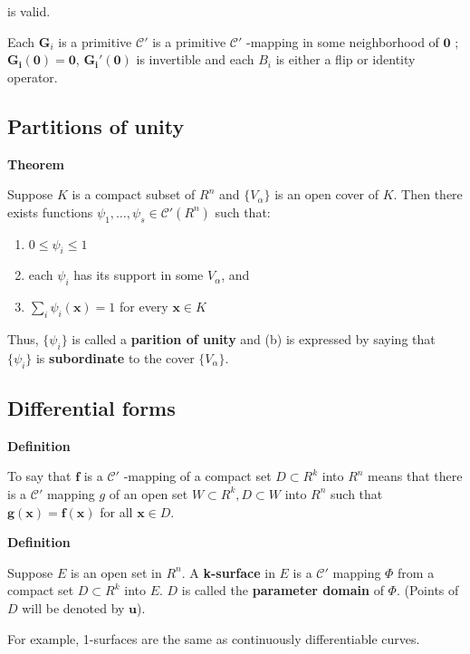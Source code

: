 \documentclass[11pt]{article}
\begin{document}
is valid.

Each \(\bm{G}_i\) is a primitive \(\mathcal{C}'\) is a primitive \(\mathcal{C}'\) -mapping in some neighborhood of \(\bm{0}\) ; \(\bm{G_i(0)=0}\), \(\bm{G_i'(0)}\) is invertible and each \(B_i\) is either a flip or identity operator.


\subsection{Partitions of unity}
\label{sec:org1d97ba3}

\textbf{Theorem}

Suppose \(K\) is a compact subset of \(R^n\) and \(\{V_\alpha\}\) is an open cover of \(K\). Then there exists functions \(\psi_1,\ldots,\psi_s \in \mathcal{C}'(R^n)\) such that:

\begin{enumerate}
\item \(0 \leq \psi_i \leq 1\)
\item each \(\psi_i\) has its support in some \(V_\alpha\), and
\item \(\sum_i \psi_i(\bm{x}) = 1\) for every \(\bm{x} \in K\)
\end{enumerate}

Thus, \(\{\psi_i\}\) is called a \textbf{parition of unity} and (b) is expressed by saying that \(\{\psi_i\}\) is \textbf{subordinate} to the cover \(\{V_\alpha\}\).

\subsection{Differential forms}
\label{sec:orgbcc6b72}

\textbf{Definition}

To say that \(\bm{f}\) is a \(\mathcal{C}'\) -mapping of a compact set \(D \subset R^k\) into \(R^n\) means that there is a \(\mathcal{C}'\) mapping \(g\) of an open set \(W \subset R^k, D\subset W\) into \(R^n\) such that \(\bm{g(x)= f(x)}\) for all \(\bm{x} \in D\).

\textbf{Definition}

Suppose \(E\) is an open set in \(R^n\). A \textbf{k-surface} in \(E\) is a \(\mathcal{C}'\) mapping \(\Phi\) from a compact set \(D \subset R^k\) into \(E\).  \(D\) is called the \textbf{parameter domain} of \(\Phi\). (Points of \(D\) will be denoted by \(\bm{u}\)).

For example, 1-surfaces are the same as continuously differentiable curves.
\end{document}

